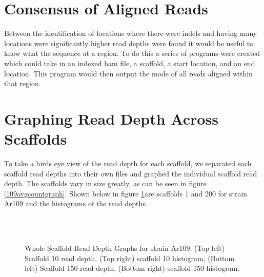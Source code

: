 \documentclass[12pt]{article}
\begin{document}
\section{Consensus of Aligned Reads}
	Between the identification of locations where there were indels and having many locations were significantly higher read depths were found it would be useful to know what the sequence at a region. To do this a series of programs were created which could take in an indexed bam file, a scaffold, a start location, and an end location. This program would then output the mode of all reads aligned within that region. 


%
%
\section{Graphing Read Depth Across Scaffolds}
	To take a birds eye view of the read depth for each scaffold, we separated each scaffold read depths into their own files and graphed the individual scaffold read depth. The scaffolds vary in size greatly, as can be seen in figure \ref{109avgcountgraph}. Shown below in figure \ref{wholescaffandhisto}are scaffolds 1 and 200 for strain Ar109 and the histograms of the read depths.

\begin{figure}[H]
	\begin{centering}

		\\
		\\
		\begin{singlespace}
			\vspace{-0.5cm}
			\caption[Whole Scaffold Read Depth Graphs.]{Whole Scaffold Read Depth Graphs for strain Ar109. (Top left) Scaffold 10 read depth, (Top right) scaffold 10 histogram, (Bottom left) Scaffold 150 read depth, (Bottom right) scaffold 150 histogram.}\label{wholescaffandhisto}
		\end{singlespace}
	\end{centering}
\end{figure}
\end{document}

